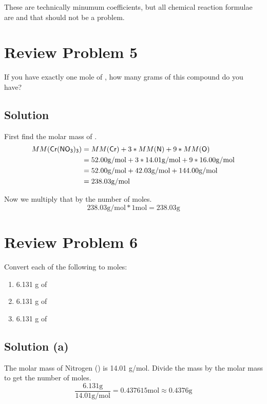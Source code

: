 \documentclass[10pt]{article}
\begin{document}
            These are technically minumum coefficients, but all chemical reaction formulae are and that should not be a problem.
    
    \pagebreak
    \section{Review Problem 5}
        If you have exactly one mole of , how many grams of this compound do you have?

        \subsection{Solution}
            First find the molar mass of .
            \begin{align}
                MM(\ce{Cr(NO3)3})   &=  MM(\ce{Cr}) + 3 * MM(\ce{N}) + 9 * MM(\ce{O})\\
                    &=  52.00 \unit{\gram/\mol} + 3 * 14.01 \unit{\gram/\mol} + 9 * 16.00 \unit{\gram/\mol}\\
                    &=  52.00 \unit{\gram/\mol} + 42.03 \unit{\gram/\mol} + 144.00 \unit{\gram/\mol}\\
                    &=  238.03 \unit{\gram/\mol}
            \end{align}

            Now we multiply that by the number of moles.
            \begin{equation}
                238.03 \unit{\gram/\mol} * 1 \unit{\mol}    =   \boxed{238.03 \unit{\gram}}
            \end{equation}
    
    \pagebreak
    \section{Review Problem 6}
        Convert each of the following to moles:
        \begin{enumerate}[label=\alph*)]
            \item 6.131 g of  
            \item 6.131 g of  
            \item 6.131 g of 
        \end{enumerate}

        \subsection{Solution (a)}
            The molar mass of Nitrogen () is 14.01 \unit{\gram/\mol}.
            Divide the mass by the molar mass to get the number of moles.
            \begin{equation}
                \frac{6.131 \unit{\gram}}{14.01 \unit{\gram/\mol}} = 0.437615 \unit{\mol} \approx \boxed{0.4376 \unit{\gram}}
            \end{equation}
\end{document}
